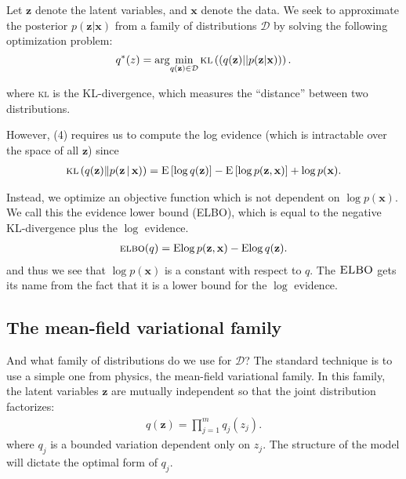 \documentclass[11pt]{article}
\newcommand{\bx}{\ensuremath{\mathbf{x}}}
\newcommand{\bz}{\ensuremath{\mathbf{z}}}
\newcommand{\kl}[1]{\textsc{kl}\left(#1\right)}
\newcommand{\g}{\,\vert\,}
\newcommand{\ELBO}{\textsc{elbo}}
\newcommand{\E}{\mathrm{E}}
\begin{document}
Let $\mathbf{z}$ denote the latent variables, and $\mathbf{x}$ denote the data. We seek to approximate the posterior $p(\mathbf{z}|\mathbf{x})$ from a family of distributions $\mathcal{D}$ by solving the following optimization problem: 
\begin{equation}
q^*(z) = \arg\!\min_{q(\mathbf{z}) \in \mathcal{D}} \kl{(q(\mathbf{z}) || p(\mathbf{z}|\mathbf{x}))}.
\end{equation}

where \textsc{kl} is the KL-divergence, which measures the ``distance'' between two distributions. 

However, (4) requires us to compute the log evidence (which is intractable over the space of all $\mathbf{z}$) since 
\begin{align}
  \kl{q(\bz) \| p(\bz \g \bx)} =
  \E\left[\log q(\bz)\right] -
  \E\left[\log p(\bz, \bx)\right] +
  \log p(\bx). 
\end{align}

Instead, we optimize an objective function which is not dependent on $\log p(\bx)$. We call this the evidence lower bound (\textsc{ELBO}), which is equal to the negative \textsc{KL}-divergence plus the $\log$ evidence.
\begin{align}
  \ELBO(q) =
  \E{\log p(\bz, \bx)} -
  \E{\log q(\bz)}.
\end{align}
and thus we see that $\log p(\bx)$ is a constant with respect to $q$. The $\textsc{ELBO}$ gets its name from the fact that it is a lower bound for the $\log$ evidence. 

\subsection{The mean-field variational family}
And what family of distributions do we use for $\mathcal{D}$? The standard technique is to use a simple one from physics, the mean-field variational family. In this family, the latent variables $\bz$ are mutually independent so that the joint distribution factorizes:
\begin{align}
  q(\bz) = \prod_{j=1}^{m} q_j(z_j).
\end{align}
where $q_j$ is a bounded variation dependent only on $z_j$. The structure of the model will dictate the optimal form of $q_j$. 
\end{document}
